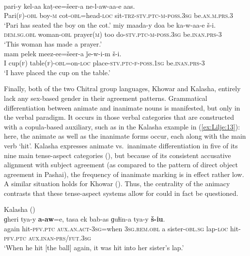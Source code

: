\documentclass[output=collectionpaper]{langsci/langscibook}
\begin{document}
\ea
\label{ex:Lilje:12}
\\
\begin{xlist}
\ex
\gll pari-y kel-aa kaṭ-ee=šeer-a ne-l-aw-aa-e aas.\\
Pari(\textsc{f})-\textsc{obl} boy-\textsc{m} cot-\textsc{obl}=head-\textsc{loc} sit-\textsc{trz-stv.ptc-m-poss.3sg} be.\textsc{an.m.prs.3}\\
\glt `Pari has seated the boy on the cot.'
\ex
\gll miy maada-y doa be ka-w-aa-e š-i.  \\
\textsc{dem.sg.obl} woman-\textsc{obl} prayer(\textsc{m}) too do-\textsc{stv.ptc-m-poss.3sg} be.\textsc{inan.prs-3}  \\
\glt `This woman has made a prayer.' \\
\ex
\gll mam pelek meez-ee=šeer-a ǰe-w-i-m š-i.   \\
I cup(\textsc{f}) table(\textsc{f})-\textsc{obl}=on-\textsc{loc} place-\textsc{stv.ptc-f-poss.1sg} be.\textsc{inan.prs-3}   \\
\glt `I have placed the cup on the table.'
\end{xlist}
\z

Finally, both of the two Chitral group languages, Khowar and Kalasha, entirely lack any sex-based gender in their agreement patterns. Grammatical differentiation between animate and inanimate nouns is manifested, but only in the verbal paradigm. It occurs in those verbal categories that are constructed with a copula-based auxiliary, such as in the Kalasha example in (\ref{ex:Lilje:13}): here, the animate as well as the inanimate forms occur, each along with the main verb `hit'. Kalasha expresses animate vs.\ inanimate differentiation in five of its nine main tense-aspect categories (\citealt[60--72]{Bashir1988}), but because of its consistent accusative alignment with subject agreement (as compared to the pattern of direct object agreement in Pashai), the frequency of inanimate marking is in effect rather low. A similar situation holds for Khowar (\citealt[123--133]{Bashir1988}). Thus, the centrality of the animacy contrasts that these tense-aspect systems allow for could in fact be questioned.

\ea
\label{ex:Lilje:13}
Kalasha (\citealt[250]{HeegardPetersen2015})\\
\gll ɡheri tya{}-y \textbf{a{}-}\textbf{aw}=e, tasa ek bab{}-as ɡuɫin{}-a tya{}-y \textbf{š{}-}\textbf{iu}.    \\
again hit-\textsc{pfv.ptc} \textsc{aux.an.act-3sg}=when \textsc{3sg.rem.obl} a sister-\textsc{obl.sg} lap-\textsc{loc} hit-\textsc{pfv.ptc} \textsc{aux.inan-prs/fut.3sg}\\
\glt `When he hit [the ball] again, it was hit into her sister's lap.'
\z
\end{document}
